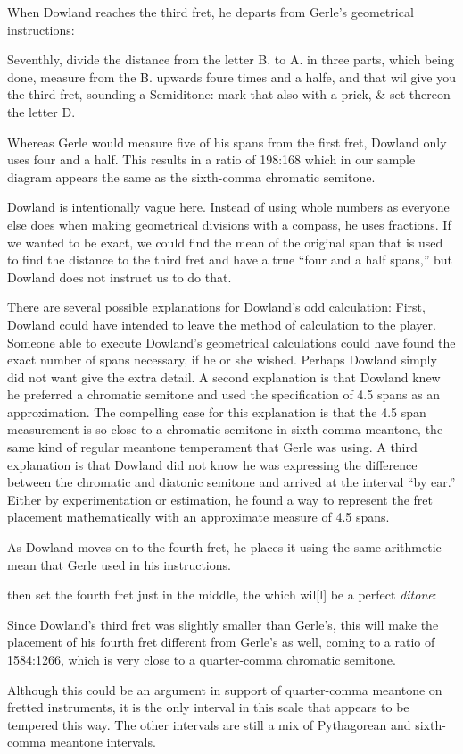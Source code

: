 When Dowland reaches the third fret, he departs from Gerle's geometrical instructions:
\begin{blocks}
Seventhly, divide the distance from the letter B. to A. in three parts, which being
done, measure from the B. upwards foure times and a halfe, and that wil give you the
third fret, sounding a Semiditone: mark that also with a prick, \& set thereon the
letter D.
\end{blocks}
Whereas Gerle would measure five of his spans from the first fret, Dowland only
uses four and a half. This results in a ratio of 198:168 which in our sample diagram
appears the same as the sixth-comma chromatic semitone.

Dowland is intentionally vague here. Instead of using whole numbers as everyone else
does when making geometrical divisions with a compass, he uses fractions. If we wanted
to be exact, we could find the mean of the original span that is used to
find the distance to the third fret and have a true ``four and a half spans,'' but
Dowland does not instruct us to do that.

There are several possible explanations for Dowland's odd calculation: First, Dowland could have intended to leave the
method of calculation to the player. Someone able to execute Dowland's geometrical calculations could have found the
exact number of spans necessary, if he or she wished. Perhaps Dowland simply did not want give the extra detail. A
second explanation is that Dowland knew he preferred a chromatic semitone and used the specification of 4.5 spans as an
approximation. The compelling case for this explanation is that the 4.5 span measurement is so close to a chromatic
semitone in sixth-comma meantone, the same kind of regular meantone temperament that Gerle was using. A third
explanation is that Dowland did not know he was expressing the difference between the chromatic and diatonic semitone
and arrived at the interval ``by ear.'' Either by experimentation or estimation, he found a way to represent the fret
placement mathematically with an approximate measure of 4.5 spans.

As Dowland moves on to the fourth fret, he places it using the same arithmetic mean that
Gerle used in his instructions.
\begin{blocks}
then set the fourth fret just in the middle, the which wil[l] be a perfect
\emph{ditone}:
\end{blocks}
Since Dowland's third fret was slightly smaller than Gerle's, this will make the
placement of his fourth fret different from Gerle's as well, coming to a ratio of
1584:1266, which is very close to a quarter-comma chromatic semitone.

Although this could be an argument in support of quarter-comma meantone on
fretted instruments, it is the only interval in this scale that appears to be tempered
this way. The other intervals are still a mix of Pythagorean and sixth-comma meantone
intervals.

